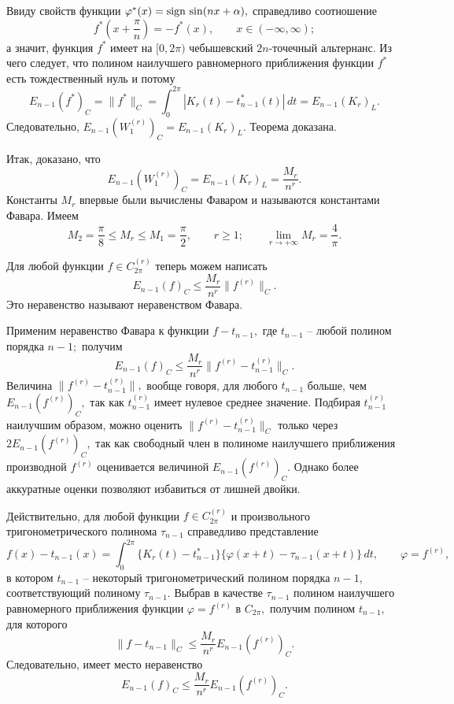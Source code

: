  Ввиду свойств функции  $\varphi^*(x)={\rm sign \, } \sin(nx+\alpha),$ справедливо соотношение
 $$
 f^*\left( x+\frac{\pi}{n}\right)=-f^*(x),\qquad x\in(-\infty,\infty);
 $$
а значит, функция $f^*$ имеет на $[0,2\pi)$ чебышевский $2n$-точечный
альтернанс. Из чего следует, что полином наилучшего равномерного приближения
функции $f^*$ есть тождественный нуль и потому
 $$
 E_{n-1}(f^*)_C=\|f^*\|_C=\int_0^{2\pi}
 |K_r(t)-t_{n-1}^*(t)|\, dt=E_{n-1}(K_r)_L.
 $$
 Следовательно, $E_{n-1}({W_1^{(r)}})_C=E_{n-1}(K_r)_L.$
 Теорема доказана.

 Итак, доказано, что
 $$
 E_{n-1}({W_1^{(r)}})_C=E_{n-1}(K_r)_L=\frac{M_r}{n^r}.
 $$
 Константы $M_r$ впервые были вычислены Фаваром и называются
 константами Фавара.  Имеем
 $$
 M_2=\frac{\pi}{8}\le M_r\le M_1=\frac{\pi}{2},\qquad r\ge 1;
 \qquad \lim_{r\to +\infty}M_r=\frac{4}{\pi}.
 $$





 Для любой функции $f\in C^{(r)}_{2\pi}$
 теперь можем написать
 \begin{equation}\label{f19-4}
 E_{n-1}(f)_C \le \frac{M_r}{n^r} \|f^{(r)}\|_C. %
 \end{equation}
 Это неравенство называют неравенством Фавара.

 Применим неравенство Фавара к функции $f-t_{n-1},$ где $t_{n-1}$
 -- любой полином порядка $n-1;$ получим
 $$
 E_{n-1}(f)_C \le \frac{M_r}{n^r} \|f^{(r)}-t_{n-1}^{(r)}\|_C.
 $$
 Величина $\|f^{(r)}-t_{n-1}^{(r)}\|,$ вообще говоря, для любого $t_{n-1}$
 больше, чем $E_{n-1}(f^{(r)})_C,$
 так как $t_{n-1}^{(r)}$ имеет нулевое  среднее значение. Подбирая
 $t_{n-1}^{(r)}$ наилучшим образом, можно оценить
 \mbox{$\|f^{(r)}-t_{n-1}^{(r)}\|_C$} только через $2E_{n-1}(f^{(r)})_C,$
 так как свободный член в полиноме наилучшего приближения производной $f^{(r)}$
 оценивается величиной  $E_{n-1}(f^{(r)})_C.$ {Однако более}
 {аккуратные оценки позволяют избавиться от лишней двойки.}

 {Действительно,} для любой функции $f\in C^{(r)}_{2\pi}$ и произвольного
 тригонометрического полинома $\tau_{n-1}$ справедливо  представление
 $$
 f(x)-{t}_{n-1}(x) =\int_0^{2\pi} \{
 K_r(t)-t_{n-1}^*\}\{\varphi(x+t)-\tau_{n-1}(x+t)\}\, dt,\qquad \varphi=f^{(r)},
 $$
 в котором {$t_{n-1}$} -- некоторый тригонометрический полином порядка $n-1$,
 {соответствующий полиному $\tau_{n-1}$}.
 Выбрав в качестве  $\tau_{n-1}$ полином наилучшего равномерного приближения функции
 \mbox{$\varphi=f^{(r)}$} в $C_{2\pi},$
 получим полином {$t_{n-1},$} для которого
 $$
 \|f-{t}_{n-1}\|_C\le \frac{M_r}{n^r} E_{n-1} (f^{(r)})_C.
 $$
 Следовательно, имеет место неравенство
 \begin{equation}\label{f19-5}
 E_{n-1}(f)_C\le \frac{M_r}{n^r} E_{n-1}(f^{(r)})_C. %
 \end{equation}

